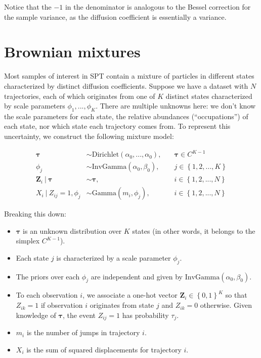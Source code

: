 \documentclass{article}
\let\vec\boldsymbol
\begin{document}
Notice that the $-1$ in the denominator is analogous to the Bessel
correction for the sample variance, as the diffusion coefficient is essentially
a variance.

\section{Brownian mixtures}

Most samples of interest in SPT contain a mixture of particles in different
states characterized by distinct diffusion coefficients. Suppose we have a dataset
with $N$ trajectories, each of which originates from one of $K$ distinct states
characterized by scale parameters $\phi_{1}, ..., \phi_{K}$. There are multiple
unknowns here: we don't know the scale parameters for each state, the relative
abundances (``occupations'') of each state, nor which state each trajectory comes
from. To represent this uncertainty, we construct the following mixture model:

\begin{align}\label{eq:brownian_mixture}
    \boldsymbol{\tau} &\sim \text{Dirichlet} \left( \alpha_{0}, ..., \alpha_{0} \right), &\quad \boldsymbol{\tau} \in C^{K-1} \\
    \phi_{j} &\sim \text{InvGamma} \left( \alpha_{0}, \beta_{0} \right), &\quad j \in \left\{ 1, 2, ..., K \right\} \\
    \vec{Z}_{i} \ | \ \boldsymbol{\tau} &\sim \boldsymbol{\tau}, &\quad i \in \left\{ 1, 2, ..., N \right\} \\
    X_{i} \ | \ Z_{ij} = 1, \phi_{j} &\sim \text{Gamma} \left( m_{i}, \phi_{j} \right), &\quad i \in \left\{ 1, 2, ..., N \right\}
\end{align}

Breaking this down:
\begin{itemize}
    \item $\boldsymbol{\tau}$ is an unknown distribution over $K$ states (in other words, it belongs to the simplex $C^{K-1}$).
    \item Each state $j$ is characterized by a scale parameter $\phi_{j}$.
    \item The priors over each $\phi_{j}$ are independent and given by $\text{InvGamma} (\alpha_{0}, \beta_{0})$.
    \item To each observation $i$, we associate a one-hot vector $\vec{Z}_{i} \in \left\{ 0, 1 \right\}^{K}$ so that $Z_{ik} = 1$ if observation $i$ originates from state $j$ and $Z_{ik} = 0$ otherwise. Given knowledge of $\boldsymbol{\tau}$, the event $Z_{ij} = 1$ has probability $\tau_{j}$.
    \item $m_{i}$ is the number of jumps in trajectory $i$.
    \item $X_{i}$ is the sum of squared displacements for trajectory $i$.
\end{itemize}
\end{document}
